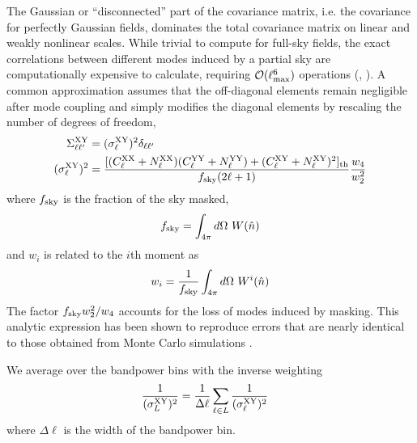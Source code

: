 \documentclass[a4paper,usenatbib]{mnras}
\begin{document}
The Gaussian or ``disconnected'' part of the covariance matrix, i.e. the covariance for perfectly Gaussian fields, dominates the total covariance matrix on linear and weakly nonlinear scales. While trivial to compute for full-sky fields, the exact correlations between different modes induced by a partial sky are computationally expensive to calculate, requiring $\mathcal{O}(\ell_{\rm max}^6)$ operations (\citealt{Efstathiou04b}, \citealt{Garcia++19}). A common approximation assumes that the off-diagonal elements remain negligible after mode coupling and simply modifies the diagonal elements by rescaling the number of degrees of freedom,
\begin{align}\label{eq:cov_gen}
    \Sigma^{\rm XY}_{\ell\ell^{\prime}}  &= (\sigma^{\rm XY}_{\ell})^2 \delta_{\ell \ell^{\prime}} \\ 
    (\sigma^{\rm XY}_{\ell})^2 &= \frac{[(C^{\rm XX}_{\ell}+N^{\rm XX}_{\ell})(C^{\rm YY}_{\ell}+N^{\rm YY}_{\ell}) + (C^{\rm XY}_{\ell} + N^{\rm XY}_{\ell})^2]_{\rm th}}{f_{\rm sky}(2\ell + 1)}\frac{w_4}{w_2^2} \nonumber
\end{align}
where $f_{\rm sky}$ is the fraction of the sky masked,
\begin{equation}
    f_{\rm sky} = \int_{4\pi}d\Omega \ W(\hat{n})
\end{equation}
and $w_i$ is related to the $i$th moment as
\begin{equation}
    w_i = \frac{1}{f_{\rm sky}}\int_{4\pi}d\Omega \ W^{i}(\hat{n})
\end{equation}
The factor $f_{\rm sky}w_2^2/w_4$ accounts for the loss of modes induced by masking. This analytic expression has been shown to reproduce errors that are nearly identical to those obtained from Monte Carlo simulations \citep{MASTER}.

We average over the bandpower bins with the inverse weighting
\begin{align}
    \frac{1}{(\sigma_{L}^{\rm XY})^2} &= \frac{1}{\Delta \ell} \sum_{\ell \in L} \frac{1}{(\sigma_{\ell}^{\rm XY})^2}
\end{align}
where $\Delta \ell$ is the width of the bandpower bin.
\end{document}
